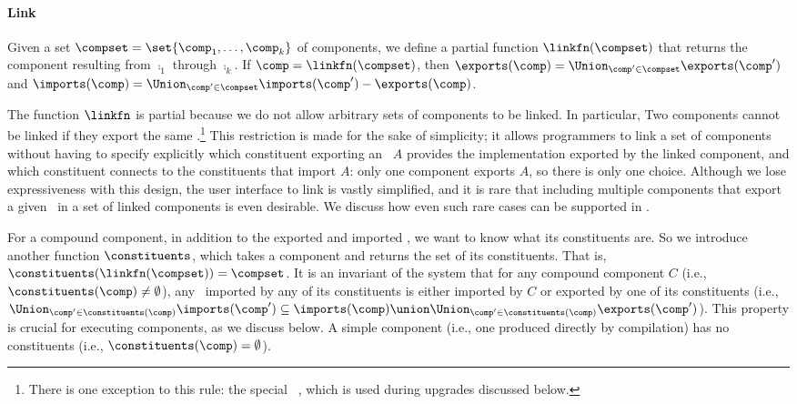\paragraph{Link}
Given a set $\compset = \set{\comp_1,\ldots,\comp_k}$ of components,
we define a partial function $\linkfn(\compset)$
that returns the component resulting from $\comp_1$ through $\comp_k$.
If $\comp = \linkfn(\compset)$,
then $\exports(\comp) = \Union_{\comp' \in \compset} \exports(\comp')$
and $\imports(\comp) = \Union_{\comp' \in \compset} \imports(\comp')
                      - \exports(\comp)$.

The function $\linkfn$ is partial
because we do not allow arbitrary sets of components to be linked.
In particular,
Two components cannot be linked if they export the same
\apiN.\!\footnote{There is one exception to this rule:
the special \apiN\ \upgapi, which is used during upgrades discussed below.}
This restriction is made for the sake of simplicity;
it allows programmers to link a set of components
without having to specify explicitly
which constituent exporting an \apiN\ $A$
provides the implementation exported by the linked component,
and which constituent connects to the constituents that import $A$:
only one component exports $A$, so there is only one choice.
Although we lose expressiveness with this design,
the user interface to link is vastly simplified,
and it is rare that including multiple components that export a given \apiN\
in a set of linked components is even desirable.
We discuss how even such rare cases can be supported in
.

For a compound component,
in addition to the exported and imported \apisN,
we want to know what its constituents are.
So we introduce another function $\constituents$,
which takes a component and returns the set of its constituents.
That is,
$\constituents(\linkfn(\compset)) = \compset$.
It is an invariant of the system
that for any compound component $C$
(i.e., $\constituents(\comp) \neq \emptyset$),
any \apiN\ imported by any of its constituents
is either imported by $C$ or exported by one of its constituents
(i.e., $\Union_{\comp' \in \constituents(\comp)} \imports(\comp')
          \subseteq \imports(\comp) \union \Union_{\comp' \in
          \constituents(\comp)} \exports(\comp')$). 
This property is crucial for executing components, as we discuss below.
A simple component (i.e., one produced directly by compilation)
has no constituents (i.e., $\constituents(\comp) = \emptyset$).

